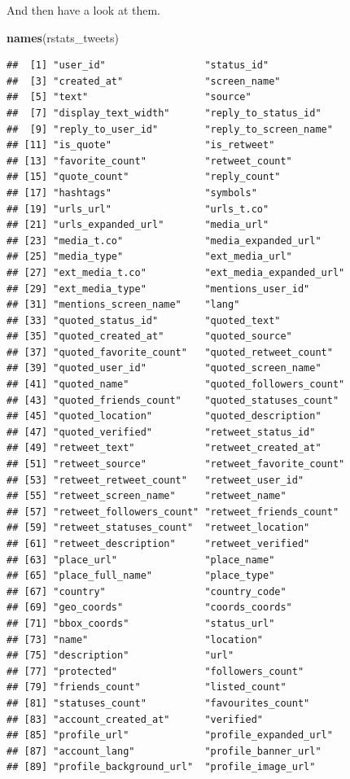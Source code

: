 \documentclass[
]{book}
\newenvironment{Shaded}{\begin{snugshade}}{\end{snugshade}}
\newcommand{\KeywordTok}[1]{\textcolor[rgb]{0.13,0.29,0.53}{\textbf{#1}}}
\newcommand{\NormalTok}[1]{#1}
\begin{document}
And then have a look at them.

\begin{Shaded}
\begin{Highlighting}[]
\KeywordTok{names}\NormalTok{(rstats_tweets)}
\end{Highlighting}
\end{Shaded}

\begin{verbatim}
##  [1] "user_id"                 "status_id"              
##  [3] "created_at"              "screen_name"            
##  [5] "text"                    "source"                 
##  [7] "display_text_width"      "reply_to_status_id"     
##  [9] "reply_to_user_id"        "reply_to_screen_name"   
## [11] "is_quote"                "is_retweet"             
## [13] "favorite_count"          "retweet_count"          
## [15] "quote_count"             "reply_count"            
## [17] "hashtags"                "symbols"                
## [19] "urls_url"                "urls_t.co"              
## [21] "urls_expanded_url"       "media_url"              
## [23] "media_t.co"              "media_expanded_url"     
## [25] "media_type"              "ext_media_url"          
## [27] "ext_media_t.co"          "ext_media_expanded_url" 
## [29] "ext_media_type"          "mentions_user_id"       
## [31] "mentions_screen_name"    "lang"                   
## [33] "quoted_status_id"        "quoted_text"            
## [35] "quoted_created_at"       "quoted_source"          
## [37] "quoted_favorite_count"   "quoted_retweet_count"   
## [39] "quoted_user_id"          "quoted_screen_name"     
## [41] "quoted_name"             "quoted_followers_count" 
## [43] "quoted_friends_count"    "quoted_statuses_count"  
## [45] "quoted_location"         "quoted_description"     
## [47] "quoted_verified"         "retweet_status_id"      
## [49] "retweet_text"            "retweet_created_at"     
## [51] "retweet_source"          "retweet_favorite_count" 
## [53] "retweet_retweet_count"   "retweet_user_id"        
## [55] "retweet_screen_name"     "retweet_name"           
## [57] "retweet_followers_count" "retweet_friends_count"  
## [59] "retweet_statuses_count"  "retweet_location"       
## [61] "retweet_description"     "retweet_verified"       
## [63] "place_url"               "place_name"             
## [65] "place_full_name"         "place_type"             
## [67] "country"                 "country_code"           
## [69] "geo_coords"              "coords_coords"          
## [71] "bbox_coords"             "status_url"             
## [73] "name"                    "location"               
## [75] "description"             "url"                    
## [77] "protected"               "followers_count"        
## [79] "friends_count"           "listed_count"           
## [81] "statuses_count"          "favourites_count"       
## [83] "account_created_at"      "verified"               
## [85] "profile_url"             "profile_expanded_url"   
## [87] "account_lang"            "profile_banner_url"     
## [89] "profile_background_url"  "profile_image_url"
\end{verbatim}
\end{document}
